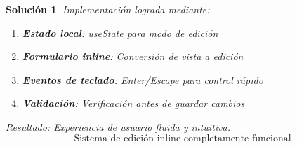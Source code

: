 \documentclass[12pt,a4paper]{article}
\newtheorem{solution}{Solución}
\begin{document}
\begin{solution}
Implementación lograda mediante:

\begin{enumerate}
  \item \textbf{Estado local}: useState para modo de edición
  \item \textbf{Formulario inline}: Conversión de vista a edición
  \item \textbf{Eventos de teclado}: Enter/Escape para control rápido
  \item \textbf{Validación}: Verificación antes de guardar cambios
\end{enumerate}

Resultado: Experiencia de usuario fluida y intuitiva.
\[
\boxed{\text{Sistema de edición inline completamente funcional}}
\]
\end{solution}
\end{document}
